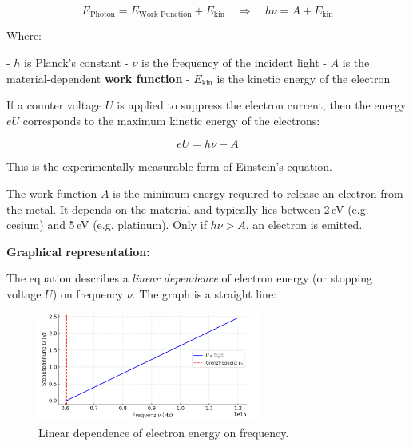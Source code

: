 \[
E_{\text{Photon}} = E_{\text{Work Function}} + E_{\text{kin}}
\quad\Rightarrow\quad h \nu = A + E_{\text{kin}}
\]


Where:

- \( h \) is Planck’s constant  
- \( \nu \) is the frequency of the incident light  
- \( A \) is the material-dependent \textbf{work function}  
- \( E_{\text{kin}} \) is the kinetic energy of the electron

If a counter voltage \( U \) is applied to suppress the electron current, then the energy \( e U \) corresponds to the maximum kinetic energy of the electrons:

\[
eU = h \nu - A
\]

This is the experimentally measurable form of Einstein’s equation.

\vspace{0.5em}
\begin{tcolorbox}[physikbox, title=What is the Work Function \( A \)?]
	\label{bos:was ist Austrittsarbeit}
	\small
	The work function \( A \) is the minimum energy required to release an electron from the metal. It depends on the material and typically lies between 2\,eV (e.g. cesium) and 5\,eV (e.g. platinum). Only if \( h \nu > A \), an electron is emitted.
\end{tcolorbox}
\vspace{1em}

\textbf{Graphical representation:}

The equation describes a \textit{linear dependence} of electron energy (or stopping voltage \( U \)) on frequency \( \nu \). The graph is a straight line:
\begin{figure}[H]
	\includegraphics[width=0.65\textwidth]{bilder/photoeffekt.png}
	\caption{Linear dependence of electron energy on frequency.}
\end{figure}

